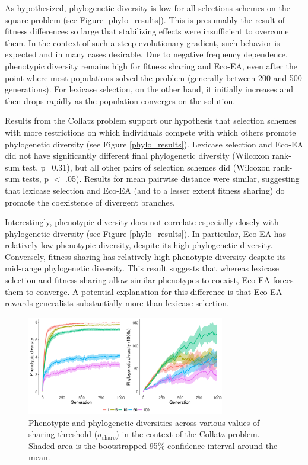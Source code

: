 As hypothesized, phylogenetic diversity is low for all selections schemes on the square problem (see Figure \ref{phylo_results}). This is presumably the result of fitness differences so large that stabilizing effects were insufficient to overcome them. In the context of such a steep evolutionary gradient, such behavior is expected and in many cases desirable. Due to negative frequency dependence, phenotypic diversity remains high for fitness sharing and Eco-EA, even after the point where most populations solved the problem (generally between 200 and 500 generations). For lexicase selection, on the other hand, it initially increases and then drops rapidly as the population converges on the solution.

Results from the Collatz problem support our hypothesis that selection schemes with more restrictions on which individuals compete with which others promote phylogenetic diversity (see Figure \ref{phylo_results}). Lexicase selection and Eco-EA did not have significantly different final phylogenetic diversity (Wilcoxon rank-sum test, p=0.31), but all other pairs of selection schemes did (Wilcoxon rank-sum tests, p $<$ .05). Results for mean pairwise distance were similar, suggesting that lexicase selection and Eco-EA (and to a lesser extent fitness sharing) do promote the coexistence of divergent branches. 

Interestingly, phenotypic diversity does not correlate especially closely with phylogenetic diversity (see Figure \ref{phylo_results}). In particular, Eco-EA has relatively low phenotypic diversity, despite its high phylogenetic diversity. Conversely, fitness sharing has relatively high phenotypic diversity despite its mid-range phylogenetic diversity. This result suggests that whereas lexicase selection and fitness sharing allow similar phenotypes to coexist, Eco-EA forces them to converge. A potential explanation for this difference is that Eco-EA rewards generalists substantially more than lexicase selection.

\begin{figure}
\includegraphics[width=3.4in]{figs/time_sharing.png}
\caption{Phenotypic and phylogenetic diversities across various values of sharing threshold ($\sigma_{\text{share}}$) in the context of the Collatz problem. Shaded area is the bootstrapped 95\% confidence interval around the mean.}
\label{sharing}
\end{figure}

